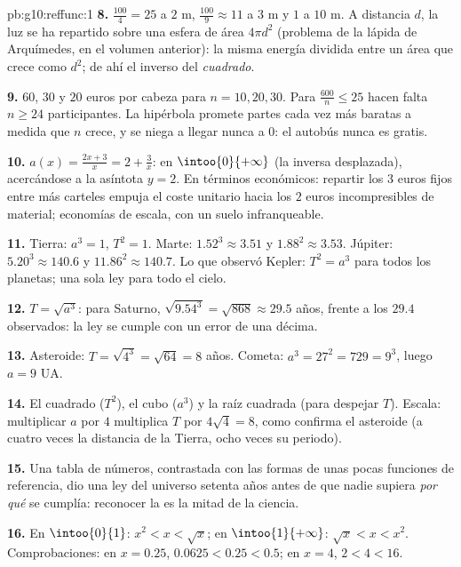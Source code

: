 \begin{solution}{pb:g10:reffunc:1}
\textbf{8.} $\frac{100}{4} = 25$ a $2$ m, $\frac{100}{9} \approx 11$ a
$3$ m y $1$ a $10$ m. A distancia $d$, la luz se ha repartido sobre una
esfera de área $4\pi d^2$ (problema de la lápida de Arquímedes, en el
volumen anterior): la misma energía dividida entre un área que crece como
$d^2$; de ahí el inverso del \emph{cuadrado}.

\textbf{9.} $60$, $30$ y $20$ euros por cabeza para $n = 10, 20, 30$. Para
$\frac{600}{n} \leq 25$ hacen falta $n \geq 24$ participantes. La
hipérbola promete partes cada vez más baratas a medida que $n$ crece, y se
niega a llegar nunca a $0$: el autobús nunca es gratis.

\textbf{10.} $a(x) = \frac{2x + 3}{x} = 2 + \frac3x$:  en
$\intoo{0}{+\infty}$ (la  inversa desplazada), acercándose a la
asíntota $y = 2$. En términos económicos: repartir los $3$ euros fijos
entre más carteles empuja el coste unitario hacia los $2$ euros
incompresibles de material; economías de escala, con un suelo
infranqueable.

\textbf{11.} Tierra: $a^3 = 1$, $T^2 = 1$. Marte: $1.52^3 \approx 3.51$ y
$1.88^2 \approx 3.53$. Júpiter: $5.20^3 \approx 140.6$ y
$11.86^2 \approx 140.7$. Lo que observó Kepler: $T^2 = a^3$ para todos los
planetas; una sola ley para todo el cielo.

\textbf{12.} $T = \sqrt{a^3}$: para Saturno,
$\sqrt{9.54^3} = \sqrt{868} \approx 29.5$ años, frente a los $29.4$
observados: la ley se cumple con un error de una décima.

\textbf{13.} Asteroide: $T = \sqrt{4^3} = \sqrt{64} = 8$ años. Cometa:
$a^3 = 27^2 = 729 = 9^3$, luego $a = 9$ UA.

\textbf{14.} El cuadrado ($T^2$), el cubo ($a^3$) y la raíz cuadrada (para
despejar $T$). Escala: multiplicar $a$ por $4$ multiplica $T$ por
$4\sqrt4 = 8$, como confirma el asteroide (a cuatro veces la distancia de
la Tierra, ocho veces su periodo).

\textbf{15.} Una tabla de números, contrastada con las formas de unas
pocas funciones de referencia, dio una ley del universo setenta años antes
de que nadie supiera \emph{por qué} se cumplía: reconocer la  es la
mitad de la ciencia.

\textbf{16.} En $\intoo{0}{1}$: $x^2 < x < \sqrt x$; en
$\intoo{1}{+\infty}$: $\sqrt x < x < x^2$. Comprobaciones: en $x = 0.25$,
$0.0625 < 0.25 < 0.5$; en $x = 4$, $2 < 4 < 16$.


\end{solution}
